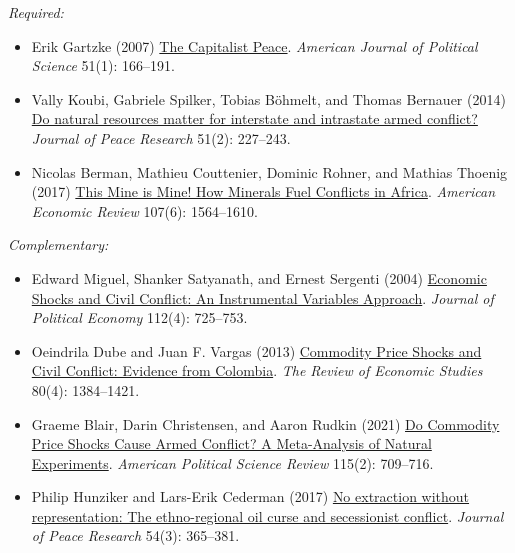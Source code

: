 \documentclass[12pt, a4paper]{article}
\begin{document}
\noindent\textit{Required:}

\begin{itemize}
  \item Erik Gartzke (2007) \href{https://doi.org/10.1111/j.1540-5907.2007.00244.x}{The Capitalist Peace}. \textit{American Journal of Political Science} 51(1): 166--191.
	\item Vally Koubi, Gabriele Spilker, Tobias Böhmelt, and Thomas Bernauer (2014) \href{https://doi.org/10.1177/002234331349345}{Do natural resources matter for interstate and intrastate armed conflict?} \textit{Journal of Peace Research} 51(2): 227--243.
	\item Nicolas Berman, Mathieu Couttenier, Dominic Rohner, and Mathias Thoenig (2017) \href{https://doi.org/10.1257/aer.20150774}{This Mine is Mine! How Minerals Fuel Conflicts in Africa}. \textit{American Economic Review} 107(6): 1564--1610.
\end{itemize}

\noindent\textit{Complementary:}

\begin{itemize}
  \item Edward Miguel, Shanker Satyanath, and Ernest Sergenti (2004) \href{https://doi.org/10.1086/421174}{Economic Shocks and Civil Conflict: An Instrumental Variables Approach}. \textit{Journal of Political Economy} 112(4): 725--753.
	\item Oeindrila Dube and Juan F. Vargas (2013) \href{https://doi.org/10.1093/restud/rdt009}{Commodity Price Shocks and Civil Conflict: Evidence from Colombia}. \textit{The Review of Economic Studies} 80(4): 1384--1421.
	\item Graeme Blair, Darin Christensen, and Aaron Rudkin (2021) \href{https://doi.org/10.1017/S0003055420000957}{Do Commodity Price Shocks Cause Armed Conflict? A Meta-Analysis of Natural Experiments}. \textit{American Political Science Review} 115(2): 709--716.
	\item Philip Hunziker and Lars-Erik Cederman (2017) \href{https://doi.org/10.1177/0022343316687365}{No extraction without representation: The ethno-regional oil curse and secessionist conflict}. \textit{Journal of Peace Research} 54(3): 365--381.
\end{itemize}
\end{document}
